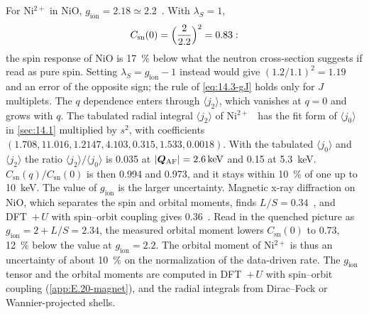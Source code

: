 For Ni$^{2+}$ in NiO, $g_{\mathrm{ion}} = 2.18 \simeq 2.2$~\cite{kritzell2024terahertz}. With $\lambda_S = 1$,
\begin{equation*}
  C_{\mathrm{sn}}(0) = \Bigl(\frac{2}{2.2}\Bigr)^2 = 0.83 :
\end{equation*}
the spin response of NiO is \SI{17}{\percent} below what the neutron cross-section suggests if read as pure spin. Setting $\lambda_S = g_{\mathrm{ion}} - 1$ instead would give $(1.2/1.1)^2 = 1.19$ and an error of the opposite sign; the rule of \cref{eq:14.3-gJ} holds only for $J$ multiplets. The $q$ dependence enters through $\langle j_2\rangle$, which vanishes at $q = 0$ and grows with $q$. The tabulated radial integral $\langle j_2\rangle$ of Ni$^{2+}$~\cite[Sect.~4.4.5]{anderson2006neutron} has the fit form of $\langle j_0\rangle$ in \cref{sec:14.1} multiplied by $s^2$, with coefficients $(1.708, 11.016, 1.2147, 4.103, 0.315, 1.533, 0.0018)$. With the tabulated $\langle j_0\rangle$ and $\langle j_2\rangle$ the ratio $\langle j_2\rangle/\langle j_0\rangle$ is 0.035 at $|\bm{Q}_{\mathrm{AF}}| = \SI{2.6}{keV}$ and 0.15 at \SI{5.3}{keV}. $C_{\mathrm{sn}}(q)/C_{\mathrm{sn}}(0)$ is then 0.994 and 0.973, and it stays within \SI{10}{\percent} of one up to \SI{10}{keV}. The value of $g_{\mathrm{ion}}$ is the larger uncertainty. Magnetic x-ray diffraction on NiO, which separates the spin and orbital moments, finds $L/S = 0.34$~\cite{fernandez1998observation}, and DFT~$+\,U$ with spin--orbit coupling gives 0.36~\cite{kwon2000unquenched}. Read in the quenched picture as $g_{\mathrm{ion}} = 2 + L/S = 2.34$, the measured orbital moment lowers $C_{\mathrm{sn}}(0)$ to 0.73, \SI{12}{\percent} below the value at $g_{\mathrm{ion}} = 2.2$. The orbital moment of Ni$^{2+}$ is thus an uncertainty of about \SI{10}{\percent} on the normalization of the data-driven rate. The $g_{\mathrm{ion}}$ tensor and the orbital moments are computed in DFT~$+\,U$ with spin--orbit coupling (\cref{app:E.20-magnet}), and the radial integrals from Dirac--Fock or Wannier-projected shells.

